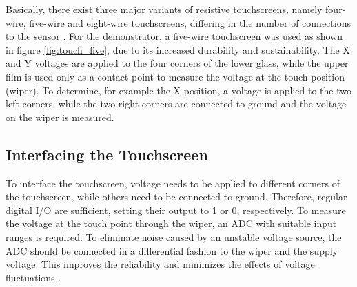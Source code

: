 Basically, there exist three major variants of resistive touchscreens, namely
four-wire, five-wire and eight-wire touchscreens, differing in the number of
connections to the sensor \citep{Wal12}. For the demonstrator, a five-wire
touchscreen was used as shown in figure \ref{fig:touch_five}, due to its
increased durability and sustainability. The X and Y voltages are applied to
the four corners of the lower glass, while the upper film is used only as a
contact point to measure the voltage at the touch position (wiper). To
determine, for example the X position, a voltage is applied to the two left
corners, while the two right corners are connected to ground and the voltage
on the wiper is measured.

\subsection{Interfacing the Touchscreen}
To interface the touchscreen, voltage needs to be applied to different corners
of the touchscreen, while others need to be connected to ground. Therefore,
regular digital I/O are sufficient, setting their output to 1 or 0,
respectively. To measure the voltage at the touch point through the wiper, an
\ac{ADC} with suitable input ranges is required. To eliminate noise caused by
an unstable voltage source, the \ac{ADC} should be connected in a differential
fashion to the wiper and the supply voltage. This improves the reliability and
minimizes the effects of voltage fluctuations \citep{OOD00}.

